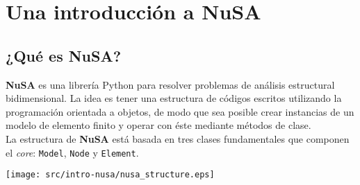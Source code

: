 \chapter{Una introducción a NuSA}

\section{¿Qué es NuSA?}

\textbf{NuSA} es una librería Python para resolver problemas de análisis estructural bidimensional. 
La idea es tener una estructura de códigos escritos utilizando la programación orientada a 
objetos, de modo que sea posible crear instancias de un modelo de elemento finito y operar 
con éste mediante métodos de clase.\\

La estructura de \textbf{NuSA} está basada en tres clases fundamentales que componen el \textit{core}: 
\texttt{Model}, \texttt{Node} y \texttt{Element}.

\begin{center}
\texttt{[image: src/intro-nusa/nusa\_structure.eps]}
\end{center}


